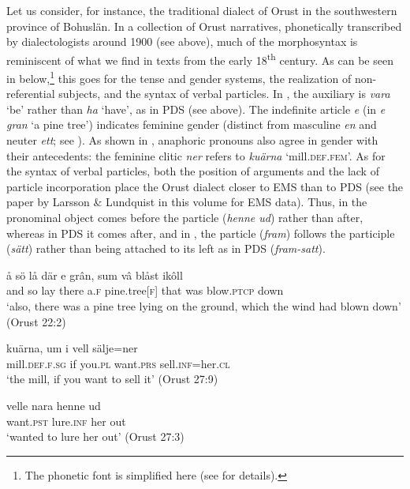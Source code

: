 \documentclass[output=paper]{langscibook}
\begin{document}
Let us consider, for instance, the traditional dialect of Orust in the southwestern province of Bohuslän. In a collection of Orust narratives, phonetically transcribed by dialectologists around 1900 (see  above), much of the morphosyntax is reminiscent of what we find in texts from the early 18\textsuperscript{th} century. As can be seen in  below,\footnote{The phonetic font is simplified here (see \citealt{Petzell2019,Petzell2020, Petzell2019} for details).} this goes for the tense and gender systems, the realization of non-referential subjects, and the syntax of verbal particles. In , the auxiliary is \textit{vara} ‘be’ rather than \textit{ha} ‘have’, as in PDS (see  above). The indefinite article \textit{e} (in \textit{e gran} ‘a pine tree’) indicates feminine gender (distinct from masculine \textit{en} and neuter \textit{ett}; see ). As shown in , anaphoric pronouns also agree in gender with their antecedents: the feminine clitic \textit{ner} refers to \textit{kuärna} ‘mill.\textsc{def}.\textsc{fem}’. As for the syntax of verbal particles, both the position of arguments and the lack of particle incorporation place the Orust dialect closer to EMS than to PDS (see the paper by Larsson \& Lundquist in this volume for EMS data). Thus, in  the pronominal object comes before the particle (\textit{henne ud}) rather than after, whereas in PDS it comes after, and in , the particle (\textit{fram}) follows the participle (\textit{sätt}) rather than being attached to its left as in PDS (\textit{fram-satt}).


\ea \label{ex:intro:39}
\ea \label{ex:intro:39a}
\gll å     sö lå   där    e     grân,     sum   vâ   blåst       ikôll\\
      and    so lay     there  a.\textsc{f}  pine.tree[\textsc{f}]    that     was blow\textsc{.ptcp}   down\\
\glt       ‘also, there was a pine tree lying on the ground, which the       wind had blown down’ (Orust 22:2)

\ex \label{ex:intro:39b}
\gll  kuärna,       um   i       vell       sälje=ner\\
    mill\textsc{.def.f.sg}   if     you\textsc{.pl}   want.\textsc{prs}   sell.\textsc{inf}=her.\textsc{cl}\\
\glt `the mill, if you want to sell it’ (Orust 27:9)

\ex \label{ex:intro:39c}
\gll  velle       nara     henne   ud\\
    want.\textsc{pst}   lure.\textsc{inf}  her     out\\
\glt `wanted to lure her out’ (Orust 27:3)
\end{document}
